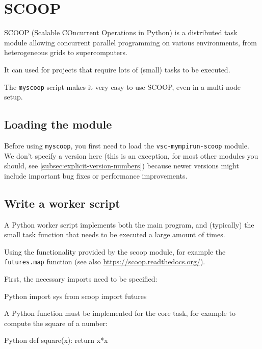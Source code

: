 \chapter{SCOOP}
\label{ch:scoop}

SCOOP (Scalable COncurrent Operations in Python) is a distributed task module allowing
concurrent parallel programming on various environments, from heterogeneous grids to supercomputers.

It can used for projects that require lots of (small) tasks to be executed.

The \lstinline|myscoop| script makes it very easy to use SCOOP, even in a multi-node setup.

\section{Loading the module}

Before using \lstinline|myscoop|, you first need to load the \lstinline|vsc-mympirun-scoop| module. We don't specify
a version here (this is an exception, for most other modules you should, see \autoref{subsec:explicit-version-numbers})
because newer versions might include important bug fixes or performance improvements.

\begin{prompt}
\end{prompt}

\section{Write a worker script}

A Python worker script implements both the main program, and (typically) the small task
function that needs to be executed a large amount of times.

Using the functionality provided by the scoop module, for example the \lstinline|futures.map|
function (see also \url{https://scoop.readthedocs.org/}).

First, the necessary imports need to be specified:

\begin{code}{Python}
import sys
from scoop import futures
\end{code}

A Python function must be implemented for the core task, for example to compute the square of a number:

\begin{code}{Python}
def square(x):
    return x*x
\end{code}

